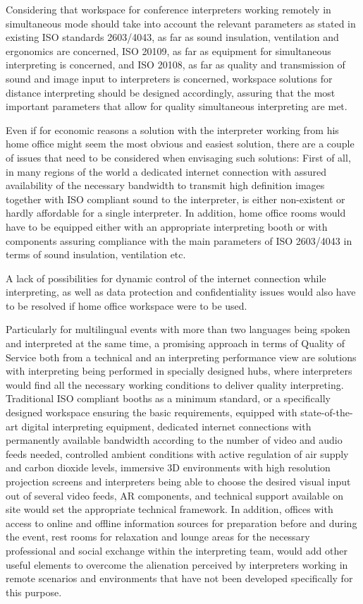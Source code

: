\documentclass[output=paper]{langsci/langscibook}
\begin{document}
Considering that workspace for conference interpreters working remotely in simultaneous mode should take into account the relevant parameters as stated in existing \textsc{ISO} standards 2603/4043, as far as sound insulation, ventilation and ergonomics are concerned, \textsc{ISO} 20109, as far as equipment for simultaneous interpreting is concerned, and \textsc{ISO} 20108, as far as quality and transmission of sound and image input to interpreters is concerned, workspace solutions for distance interpreting should be designed accordingly, assuring that the most important parameters that allow for quality simultaneous interpreting are met.

Even if for economic reasons a solution with the interpreter working from his home office might seem the most obvious and easiest solution, there are a couple of issues that need to be considered when envisaging such solutions: First of all, in many regions of the world a dedicated internet connection with assured availability of the necessary bandwidth to transmit high definition images together with \textsc{ISO} compliant sound to the interpreter, is either non-existent or hardly affordable for a single interpreter. In addition, home office rooms would have to be equipped either with an appropriate interpreting booth or with components assuring compliance with the main parameters of \textsc{ISO} 2603/4043 in terms of sound insulation, ventilation etc.

A lack of possibilities for dynamic control of the internet connection while interpreting, as well as data protection and confidentiality issues would also have to be resolved if home office workspace were to be used.

Particularly for multilingual events with more than two languages being spoken and interpreted at the same time, a promising approach in terms of Quality of Service both from a technical and an interpreting performance view are solutions with interpreting being performed in specially designed hubs, where interpreters would find all the necessary working conditions to deliver quality interpreting. Traditional \textsc{ISO} compliant booths as a minimum standard, or a specifically designed workspace ensuring the basic requirements, equipped with state-of-the-art digital interpreting equipment, dedicated internet connections with permanently available bandwidth according to the number of video and audio feeds needed, controlled ambient conditions with active regulation of air supply and carbon dioxide levels, immersive 3D environments with high resolution projection screens and interpreters being able to choose the desired visual input out of several video feeds, \textsc{AR} components, and technical support available on site would set the appropriate technical framework. In addition, offices with access to online and offline information sources for preparation before and during the event, rest rooms for relaxation and lounge areas for the necessary professional and social exchange within the interpreting team, would add other useful elements to overcome the alienation perceived by interpreters working in remote scenarios and environments that have not been developed specifically for this purpose. 
\end{document}

